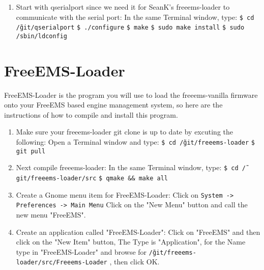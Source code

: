 \documentclass[12pt,notitlepage,onecolumn,oneside,openany]{memoir}
\begin{document}
\begin{enumerate}
\item \textsf{Start with qserialport since we need it for SeanK's freeems-loader to communicate with the serial port:} \newline
      \textsf{In the same Terminal window, type:} \newline
      \texttt{\$ cd \~/git/qserialport} \newline
      \texttt{\$ ./configure} \newline
      \texttt{\$ make} \newline
      \texttt{\$ sudo make install} \newline
      \texttt{\$ sudo /sbin/ldconfig} \newline
\end{enumerate}

\chapter{\textsf{FreeEMS-Loader}}

\textsf{FreeEMS-Loader is the program you will use to load the freeems-vanilla firmware onto your FreeEMS based engine management system, so here are the instructions of how to compile and install this program.} \newline

\begin{enumerate}
\item \textsf{Make sure your freeems-loader git clone is up to date by excuting the following:} \newline
      \textsf{Open a Terminal window and type:} \newline
      \texttt{\$ cd \~/git/freeems-loader} \newline
      \texttt{\$ git pull}

\item \textsf{Next compile freeems-loader:} \newline
      \textsf{In the same Terminal window, type:} \newline
      \texttt{\$ cd \~/git/freeems-loader/src} \newline
      \texttt{\$ qmake \&\& make all}

\item \textsf{Create a Gnome menu item for FreeEMS-Loader:} \newline
      \textsf{Click on } \texttt{System -> Preferences -> Main Menu} \newline
      \textsf{Click on the "New Menu" button and call the new menu "FreeEMS".}

\item \textsf{Create an application called "FreeEMS-Loader":} \newline
      \textsf{Click on "FreeEMS" and then click on the "New Item" button,} \newline
      \textsf{The Type is "Application", for the Name type in "FreeEMS-Loader" and browse for} \newline
      \texttt{\~/git/freeems-loader/src/Freeems-Loader} \textsf{, then click OK.}
\end{enumerate}
\end{document}
